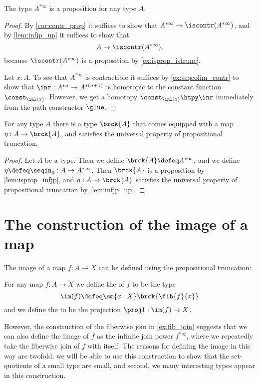 \begin{lem}\label{lem:isprop_infjp}
The type $A^{\ast\infty}$ is a proposition for any type $A$.
\end{lem}

\begin{proof}
By \cref{cor:contr_prop} it suffices to show that $A^{\ast\infty}\to \iscontr(A^{\ast\infty})$, and by \cref{lem:infjp_up} it suffices to show that
\begin{equation*}
A\to \iscontr(A^{\ast\infty}),
\end{equation*}
because $\iscontr(A^{\ast\infty})$ is a proposition by \cref{ex:isprop_istrunc}. 

Let $x:A$. To see that $A^{\ast\infty}$ is contractible it suffices by \cref{ex:seqcolim_contr} to show that $\inr:A^{\ast n}\to A^{\ast(n+1)}$ is homotopic to the constant function $\const_{\inl(x)}$. However, we get a homotopy $\const_{\inl(x)}\htpy \inr$ immediately from the path constructor $\glue$.  
\end{proof}

\begin{thm}
For any type $A$ there is a type $\brck{A}$ that comes equipped with a map $\eta:A\to \brck{A}$, and satisfies the universal property of propositional truncation.
\end{thm}

\begin{proof}
Let $A$ be a type. Then we define $\brck{A}\defeq A^{\ast\infty}$, and we define $\eta\defeq \seqin_0:A\to A^{\ast\infty}$. Then $\brck{A}$ is a proposition by \cref{lem:isprop_infjp}, and $\eta:A\to \brck{A}$ satisfies the universal property of propositional truncation by \cref{lem:infjp_up}.
\end{proof}

\section{The construction of the image of a map}
The image of a map $f:A\to X$ can be defined using the propositional truncation:
\begin{defn}
For any map $f:A\to X$ we define the  of $f$ to be the type
\begin{equation*}
\im(f) \defeq \sm{x:X}\brck{\fib{f}{x}}
\end{equation*}
and we define the  to be the projection $\proj 1 :\im(f)\to X$. 
\end{defn}
However, the construction of the fiberwise join in \cref{ex:fib_join} suggests that we can also define the image of $f$ as the infinite join power $f^{\ast\infty}$, where we repeatedly take the fiberwise join of $f$ with itself. The reasons for defining the image in this way are twofold: we will be able to use this construction to show that the set-quotients of a small type are small, and second, we many interesting types appear in this construction.

